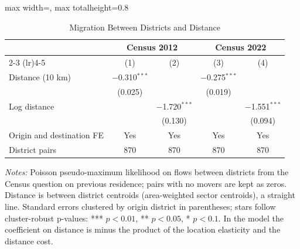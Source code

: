 \documentclass[11pt]{article}
\begin{document}
\begin{table}[H]
\centering\footnotesize\setlength{\tabcolsep}{4pt}
\caption{Migration Between Districts and Distance}
\label{tab:mt_gravity}
\begin{adjustbox}{max width=\textwidth, max totalheight=0.8\textheight}
\begin{tabular}{lcccc}
\toprule
 & \multicolumn{2}{c}{Census 2012} & \multicolumn{2}{c}{Census 2022} \\
\cmidrule(lr){2-3} \cmidrule(lr){4-5}
 & (1) & (2) & (3) & (4) \\
\midrule
Distance (10 km) & $-$0.310$^{***}$ &  & $-$0.275$^{***}$ &  \\
 & (0.025) &  & (0.019) &  \\
Log distance &  & $-$1.720$^{***}$ &  & $-$1.551$^{***}$ \\
 &  & (0.130) &  & (0.094) \\
\midrule
Origin and destination FE & Yes & Yes & Yes & Yes \\
District pairs & 870 & 870 & 870 & 870 \\
\bottomrule
\end{tabular}
\end{adjustbox}
\begin{minipage}{0.97\textwidth}\scriptsize
\textit{Notes:} Poisson pseudo-maximum likelihood on flows between districts from the Census question on previous residence; pairs with no movers are kept as zeros. Distance is between district centroids (area-weighted sector centroids), a straight line. Standard errors clustered by origin district in parentheses; stars follow cluster-robust p-values: *** $p<0.01$, ** $p<0.05$, * $p<0.1$. In the model the coefficient on distance is minus the product of the location elasticity and the distance cost.
\end{minipage}
\end{table}
\clearpage
\end{document}
